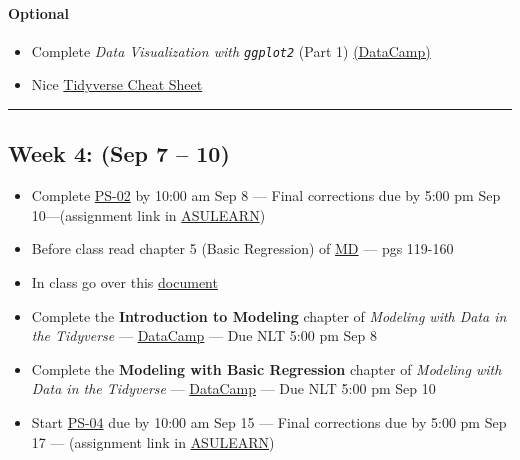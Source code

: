\documentclass[
]{article}
\begin{document}
\begin{rmdoptional}
\hypertarget{optional}{%
\paragraph*{Optional}\label{optional}}

\begin{itemize}
\item
  Complete \emph{Data Visualization with \texttt{ggplot2}} (Part 1)
  \href{https://www.datacamp.com/}{(DataCamp)}
\item
  Nice
  \href{http://datacamp-community.s3.amazonaws.com/e63a8f6b-2aa3-4006-89e0-badc294b179c}{Tidyverse
  Cheat Sheet}
\end{itemize}
\end{rmdoptional}

\begin{center}\rule{0.5\linewidth}{0.5pt}\end{center}

\hypertarget{week-4-sep-7-10}{%
\subsection*{Week 4: (Sep 7 -- 10)}\label{week-4-sep-7-10}}

\begin{itemize}
\item
  Complete
  \href{https://classroom.github.com/classrooms/87543903-stt3850-fall2021}{PS-02}
  by 10:00 am Sep 8 --- Final corrections due by 5:00 pm Sep
  10---(assignment link in
  \href{https://asulearn.appstate.edu/course/view.php?id=131169}{ASULEARN})
\item
  Before class read chapter 5 (Basic Regression) of
  \href{https://moderndive.com}{MD} --- pgs 119-160
\item
  In class go over this
  \href{https://stat-ata-asu.github.io/STT3851ClassRepo/Handouts/regression.html}{document}
\item
  Complete the \textbf{Introduction to Modeling} chapter of
  \emph{Modeling with Data in the Tidyverse} ---
  \href{https://app.datacamp.com/groups/stt3850-fall2021/assignments}{DataCamp}
  --- Due NLT 5:00 pm Sep 8
\item
  Complete the \textbf{Modeling with Basic Regression} chapter of
  \emph{Modeling with Data in the Tidyverse} ---
  \href{https://app.datacamp.com/groups/stt3850-fall2021/assignments}{DataCamp}
  --- Due NLT 5:00 pm Sep 10
\item
  Start
  \href{https://classroom.github.com/classrooms/87543903-stt3850-fall2021}{PS-04}
  due by 10:00 am Sep 15 --- Final corrections due by 5:00 pm Sep 17 ---
  (assignment link in
  \href{https://asulearn.appstate.edu/course/view.php?id=131169}{ASULEARN})
\end{itemize}
\end{document}

